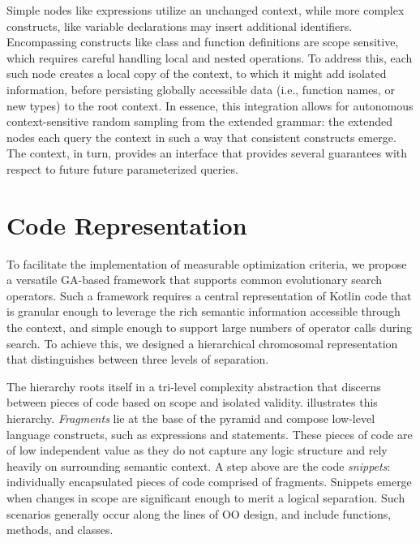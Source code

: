 Simple nodes like expressions utilize an unchanged context, while more complex
constructs, like variable declarations may insert additional identifiers.
Encompassing constructs like class and function definitions are scope sensitive,
which requires careful handling local and nested operations.
To address this, each such node creates a local copy of the context, to
which it might add isolated information, before persisting globally accessible data
(i.e., function names, or new types) to the root context.
In essence, this integration allows for autonomous context-sensitive random sampling from the 
extended grammar: the extended nodes each query the context
in such a way that consistent constructs emerge.
The context, in turn, provides an interface that provides several guarantees with respect 
to future future parameterized queries.

\section{\label{sec:repr} Code Representation}

To facilitate the implementation of measurable 
optimization criteria, we propose a versatile \gls{GA}-based framework
that supports common evolutionary search operators.
Such a framework requires a central representation of Kotlin code that is
granular enough to leverage the rich semantic information accessible through
the context, and simple enough to support large numbers of operator
calls during search.
To achieve this, we designed a hierarchical chromosomal representation
that distinguishes between three levels of separation.

The hierarchy roots itself in a tri-level
complexity abstraction that discerns between pieces of code
based on scope and isolated validity.
 illustrates this hierarchy.
\textit{Fragments} lie at the base of the pyramid and compose low-level 
language constructs, such as expressions and statements.
These pieces of code are of low independent value as they do not
capture any logic structure and rely heavily on surrounding semantic context.
A step above are the code \textit{snippets}: individually encapsulated
pieces of code comprised of fragments.
Snippets emerge when changes in scope are significant enough to
merit a logical separation.
Such scenarios generally occur along the lines of \gls{OO} design,
and include functions, methods, and classes.


